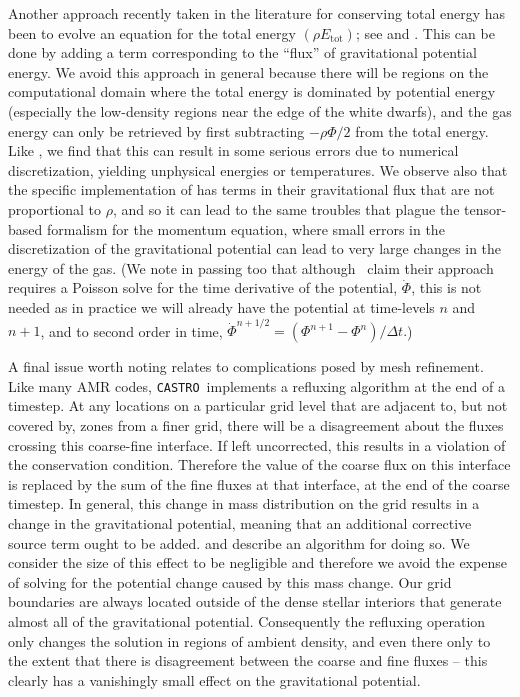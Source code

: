 \documentclass[iop]{../emulateapj}
\newcommand{\castro}{\texttt{CASTRO}}
\begin{document}
Another approach recently taken in the literature for conserving total energy has been to evolve an 
equation for the total energy $(\rho E_{\text{tot}})$; see \cite{marcello:2012} and \cite{jiang:2013}.
This can be done by adding a term corresponding to the ``flux'' of gravitational potential energy. We 
avoid this approach in general because there will be regions on the computational domain where the total 
energy is dominated by potential energy (especially the low-density regions near the edge of the white dwarfs),
and the gas energy can only be retrieved by first subtracting $-\rho \Phi/2$ from the total energy. Like 
\cite{arepo}, we find that this can result in some serious errors due to numerical discretization, yielding 
unphysical energies or temperatures. We observe also that the specific implementation of \cite{jiang:2013} 
has terms in their gravitational flux that are not proportional to $\rho$, and so it can lead to the 
same troubles that plague the tensor-based formalism for the momentum equation, where small errors 
in the discretization of the gravitational potential can lead to very large changes in the energy of the gas.
(We note in passing too that although \citeauthor{jiang:2013}\ claim their approach requires a Poisson 
solve for the time derivative of the potential, $\dot{\Phi}$, this is not needed as in practice 
we will already have the potential at time-levels $n$ and $n+1$, and to second order in time, 
$\dot{\Phi}^{n+1/2} = (\Phi^{n+1} - \Phi^{n}) / \Delta t.$)

A final issue worth noting relates to complications posed by mesh refinement. Like 
many AMR codes, \castro\ implements a refluxing algorithm at the end of a timestep. 
At any locations on a particular grid level that are adjacent to, but not covered by,
zones from a finer grid, there will be a disagreement about the fluxes crossing 
this coarse-fine interface. If left uncorrected, this results in a violation of 
the conservation condition. Therefore the value of the coarse flux on this interface 
is replaced by the sum of the fine fluxes at that interface, at the end of the 
coarse timestep. In general, this change in mass distribution on the grid 
results in a change in the gravitational potential, meaning that an additional 
corrective source term ought to be added. \cite{miniati:2007} and \cite{castro} 
describe an algorithm for doing so. We consider the size of this effect to be 
negligible and therefore we avoid the expense of solving for the potential change caused by 
this mass change. Our grid boundaries are always located outside of the dense 
stellar interiors that generate almost all of the gravitational potential. 
Consequently the refluxing operation only changes the solution in regions of 
ambient density, and even there only to the extent that there is disagreement 
between the coarse and fine fluxes -- this clearly has a 
vanishingly small effect on the gravitational potential.
\end{document}
